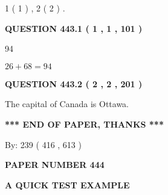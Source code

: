 \documentclass[12pt]{article}
\begin{document}
   
   1 ( 1 )
 ,
   2 ( 2 )
 .
  
\vspace{0.2in}
  
{\textbf{\Large{QUESTION
443.1 
 ( 1 , 1 , 101 )
}}}
  
  
 
 
\noindent{}

94
 
 
 
 
\noindent{}

$ %
26 +  %
68=   %
94$
 
 
  
\vspace{0.2in}
  
{\textbf{\Large{QUESTION
443.2 
 ( 2 , 2 , 201 )
}}}
  
  
 
 
\noindent{}
 
 
The capital of Canada is Ottawa.
 
 
 
 
   
   
 \vspace{0.2in}
 
   
   
   
   
\vspace{1.0in} 
{\textbf{\large{ *** END OF PAPER, THANKS *** }}} 
   
   
\hspace{1.0in} By: 
 239 ( 416 ,  613 )
   
   
   
   
\newpage 
\setcounter{page}{ 
   444001 } 
   
   
   
   
 {\textbf{ \Large{ PAPER NUMBER  444  }}}
   
   
\vspace{0.2in}
   
   
   
   
   
   
 \vspace{0.2in}
{\LARGE {\textbf{ A QUICK TEST EXAMPLE}}}
   
\end{document}
